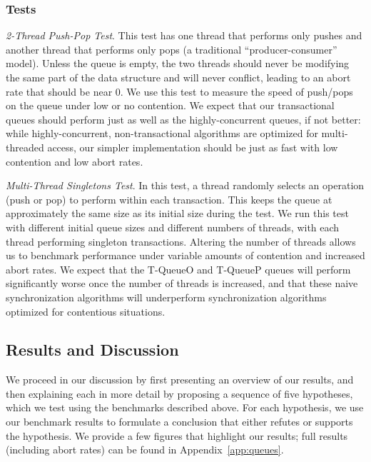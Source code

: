 \subsubsection{Tests}
    \emph{2-Thread Push-Pop Test}. This test has one thread that performs only pushes and another thread that performs only pops (a traditional ``producer-consumer'' model). Unless the queue is empty, the two threads should never be modifying the same part of the data structure and will never conflict, leading to an abort rate that should be near 0. We use this test to measure the speed of push/pops on the queue under low or no contention. We expect that our transactional queues should perform just as well as the highly-concurrent queues, if not better: while highly-concurrent, non-transactional algorithms are optimized for multi-threaded access, our simpler implementation should be just as fast with low contention and low abort rates.

\emph{Multi-Thread Singletons Test}.
    In this test, a thread randomly selects an operation (push or pop) to perform within each transaction. This keeps the queue at approximately the same size as its initial size during the test. We run this test with different initial queue sizes and different numbers of threads, with each thread performing singleton transactions. Altering the number of threads allows us to benchmark performance under variable amounts of contention and increased abort rates. We expect that the T-QueueO and T-QueueP queues will perform significantly worse once the number of threads is increased, and that these naive synchronization algorithms will underperform synchronization algorithms optimized for contentious situations.

\subsection{Results and Discussion}

We proceed in our discussion by first presenting an overview of our results, and then explaining each in more detail by proposing a sequence of five hypotheses, which we test using the benchmarks described above. For each hypothesis, we use our benchmark results to formulate a conclusion that either refutes or supports the hypothesis.
We provide a few figures that highlight our results; full results (including abort rates) can be found in Appendix~\ref{app:queues}. 

